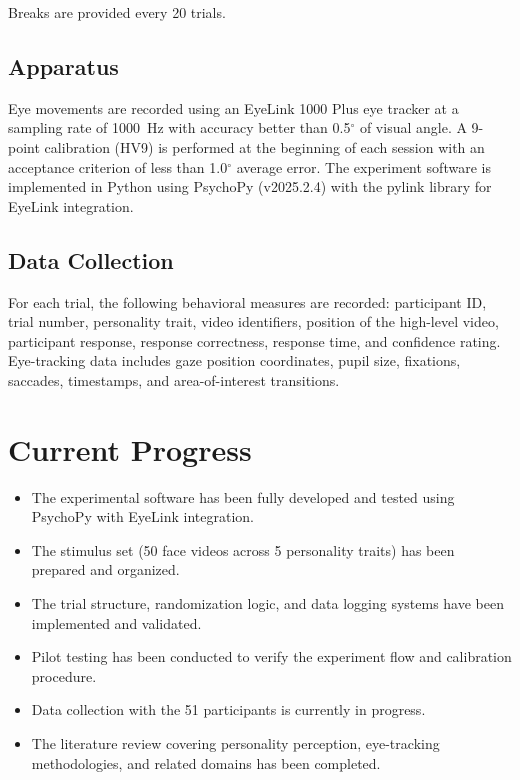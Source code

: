 \documentclass[12pt,a4paper]{article}
\begin{document}
Breaks are provided every 20 trials.

\subsection{Apparatus}

Eye movements are recorded using an EyeLink 1000 Plus eye tracker at a sampling rate of 1000~Hz with accuracy better than 0.5$^\circ$ of visual angle. A 9-point calibration (HV9) is performed at the beginning of each session with an acceptance criterion of less than 1.0$^\circ$ average error. The experiment software is implemented in Python using PsychoPy (v2025.2.4) with the pylink library for EyeLink integration.

\subsection{Data Collection}

For each trial, the following behavioral measures are recorded: participant ID, trial number, personality trait, video identifiers, position of the high-level video, participant response, response correctness, response time, and confidence rating. Eye-tracking data includes gaze position coordinates, pupil size, fixations, saccades, timestamps, and area-of-interest transitions.

\section{Current Progress}

\begin{itemize}
    \item The experimental software has been fully developed and tested using PsychoPy with EyeLink integration.
    \item The stimulus set (50 face videos across 5 personality traits) has been prepared and organized.
    \item The trial structure, randomization logic, and data logging systems have been implemented and validated.
    \item Pilot testing has been conducted to verify the experiment flow and calibration procedure.
    \item Data collection with the 51 participants is currently in progress.
    \item The literature review covering personality perception, eye-tracking methodologies, and related domains has been completed.
\end{itemize}
\end{document}
